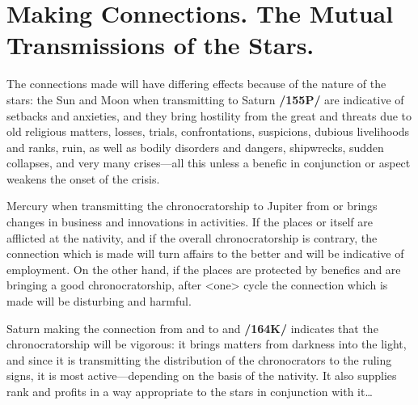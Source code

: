 \section{Making Connections. The Mutual Transmissions of the Stars.}

The connections made will have differing effects because of the nature of the stars: the Sun and Moon when transmitting to Saturn \textbf{/155P/} are indicative of setbacks and anxieties, and they bring hostility from
the great and threats due to old religious matters, losses, trials, confrontations, suspicions, dubious livelihoods and ranks, ruin, as well as bodily disorders and dangers, shipwrecks, sudden collapses, and very many crises—all this unless a benefic in conjunction or aspect weakens the onset of the crisis.

Mercury when transmitting the chronocratorship to Jupiter from \Virgo\xspace or \Gemini\xspace brings changes in business and innovations in activities. If the places or \Mercury\xspace itself are afflicted at the nativity, and if the overall chronocratorship is contrary, the connection which is made will turn affairs to the better and will be
indicative of employment. On the other hand, if the places are protected by benefics and are bringing a good chronocratorship, after <one> cycle the connection which is made will be disturbing and harmful.

Saturn making the connection from \Capricorn\xspace and \Aquarius\xspace to \Leo\xspace and \Cancer\xspace \textbf{/164K/} indicates that the chronocratorship will be vigorous: it brings matters from darkness into the light, and since it is
transmitting the distribution of the chronocrators to the ruling signs, it is most active—depending on the basis of the nativity. It also supplies rank and profits in a way appropriate to the stars in conjunction with it\ldots

\newpage